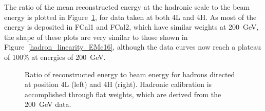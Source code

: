 

The ratio of the mean reconstructed energy at the hadronic scale to the beam energy is plotted in Figure~\ref{TBplot_hadron_linearity}, for data taken at both 4L and 4H. As most of the energy is deposited in FCal1 and FCal2, which have similar weights at 200~GeV, the shape of these plots are very similar to those shown in Figure~\ref{hadron_linearity_EMc16}, although the data curves now reach a plateau of 100\% at energies of 200~GeV.


\begin{figure}[!htb]
\begin{center}
\caption{Ratio of reconstructed energy to beam energy for hadrons directed at position 4L (left) and 4H (right). Hadronic calibration is accomplished through flat weights, which are derived from the 200~GeV data.}
\label{TBplot_hadron_linearity}
\end{center}
\end{figure}







%
%

